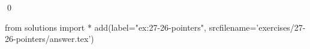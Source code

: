 
\begin{ex}
  \label{ex:27-26-pointers}
  
  \qed
\end{ex}
\begin{python0}
from solutions import *
add(label="ex:27-26-pointers",
    srcfilename='exercises/27-26-pointers/answer.tex')
\end{python0}
